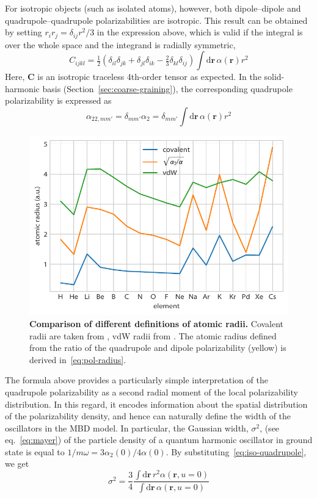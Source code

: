 For isotropic objects (such as isolated atoms), however, both dipole--dipole and quadrupole--quadrupole polarizabilities are isotropic.
This result can be obtained by setting $r_i r_j=\delta_{ij}r^2/3$ in the expression above, which is valid if the integral is over the whole space and the integrand is radially symmetric,
\begin{equation}
C_{ijkl}=\tfrac12(\delta_{il}\delta_{jk}+\delta_{jl}\delta_{ik}-\tfrac23\delta_{kl}\delta_{ij})\int\mathrm d\mathbf r\,\alpha(\mathbf r)r^2
\end{equation}
Here, $\mathbf C$ is an isotropic traceless 4th-order tensor as expected.
In the solid-harmonic basis (Section~\ref{sec:coarse-graining}), the corresponding quadrupole polarizability is expressed as
\begin{equation}
  \alpha_{22,mm'}=\delta_{mm'}\alpha_2=\delta_{mm'}\int\mathrm d\mathbf r\,\alpha(\mathbf r)r^2
  \label{eq:iso-quadrupole}
\end{equation}

\begin{figure}[t]
\includegraphics{media/pol-radii.pdf}
\caption{\textbf{Comparison of different definitions of atomic radii.}
Covalent radii are taken from \citep{CorderoDT08}, vdW radii from \citep{TkatchenkoPRL09,BondiJPC64}.
The atomic radius defined from the ratio of the quadrupole and dipole polarizability (yellow) is derived in~\eqref{eq:pol-radius}.
}\label{fig:pol-radii}
\end{figure}

The formula above provides a particularly simple interpretation of the quadrupole polarizability as a second radial moment of the local polarizability distribution.
In this regard, it encodes information about the spatial distribution of the polarizability density, and hence can naturally define the width of the oscillators in the MBD model.
In particular, the Gaussian width, $\sigma^2$, (see eq.~\ref{eq:mayer}) of the particle density of a quantum harmonic oscillator in ground state is equal to $1/m\omega=3\alpha_2(0)/4\alpha(0)$.
By substituting~\eqref{eq:iso-quadrupole}, we get
\begin{equation}
  \sigma^2=\frac34\frac{\int\mathrm d\mathbf r\,r^2\alpha(\mathbf r,u=0)}{\int\mathrm d\mathbf r\,\alpha(\mathbf r,u=0)}
\end{equation}

